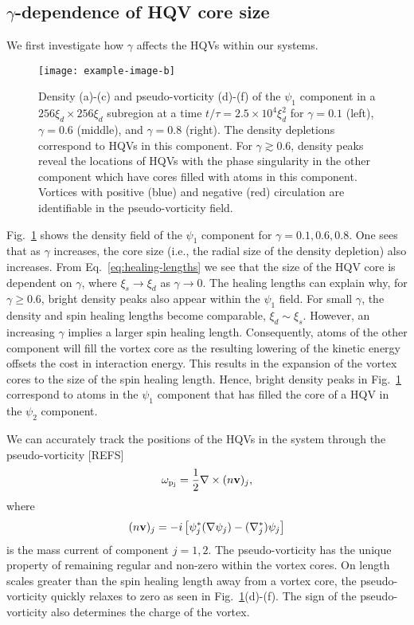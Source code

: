 \subsection{$\gamma$-dependence of HQV core size}
We first investigate how $\gamma$ affects the HQVs within our systems.
\begin{figure}
    \centering
    \texttt{[image: example-image-b]}
    \caption{Density (a)-(c) and pseudo-vorticity (d)-(f) of the $\psi_1$
    component in a $256\xi_d \times 256\xi_d$ subregion at a time 
    $t/\tau=2.5\times 10^4\xi_d^2$ for $\gamma=0.1$ (left),
    $\gamma=0.6$ (middle), and $\gamma=0.8$ (right).
    The density depletions correspond to HQVs in this component.
    For $\gamma \gtrsim 0.6$, density peaks reveal the locations of HQVs with
    the phase singularity in the other component which have cores filled with
    atoms in this component.
    Vortices with positive (blue) and negative (red) circulation are
    identifiable in the pseudo-vorticity field.}
    \label{fig:density-pseudo-vort}
\end{figure}
Fig.~\ref{fig:density-pseudo-vort} shows the density field of the $\psi_1$
component for $\gamma = 0.1, 0.6, 0.8$.
One sees that as $\gamma$ increases, the core size (i.e., the radial size of the
density depletion) also increases.
From Eq.~\eqref{eq:healing-lengths} we see that the size of the HQV core is
dependent on $\gamma$, where $\xi_s \rightarrow \xi_d$ as
$\gamma \rightarrow 0$.
The healing lengths can explain why, for $\gamma \geq 0.6$, bright density
peaks also appear within the $\psi_1$ field.
For small $\gamma$, the density and spin healing lengths become comparable,
$\xi_d \sim \xi_s$.
However, an increasing $\gamma$ implies a larger spin healing length.
Consequently, atoms of the other component will fill the vortex core as the
resulting lowering of the kinetic energy offsets the cost in interaction energy.
This results in the expansion of the vortex cores to the size of the spin
healing length.
Hence, bright density peaks in Fig.~\ref{fig:density-pseudo-vort} correspond to
atoms in the $\psi_1$ component that has filled the core of a HQV in the
$\psi_2$ component. \par
We can accurately track the positions of the HQVs in the system through
the pseudo-vorticity [REFS]
\begin{equation}
    \omega_\mathrm{p_j} = \frac{1}{2}\nabla \times (n\vb{v})_j,
\end{equation}
where
\begin{equation}
    (n\vb{v})_j = -i\left[\psi_j^*(\nabla\psi_j) - (\nabla_j^*)\psi_j\right]
\end{equation}
is the mass current of component $j=1, 2$.
The pseudo-vorticity has the unique property of remaining regular and non-zero
within the vortex cores. On length scales greater than the spin healing length
away from a vortex core, the pseudo-vorticity quickly relaxes to zero as seen
in Fig.~\ref{fig:density-pseudo-vort}(d)-(f).
The sign of the pseudo-vorticity also determines the charge of the vortex.

